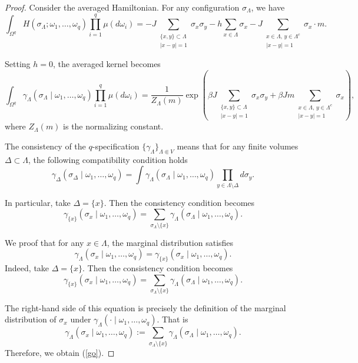 \documentclass[10pt,a4paper]{amsart}
\begin{document}
\begin{proof}
Consider the averaged Hamiltonian. For any configuration $\sigma_\Lambda$, we have
$$
\int_{\Omega^q} H(\sigma_\Lambda; \omega_1, \dots, \omega_q) \prod_{i=1}^q \mu(d\omega_i) = -J \sum_{\substack{\{x,y\} \subset \Lambda \\ |x-y|=1}} \sigma_x \sigma_y - h \sum_{x \in \Lambda} \sigma_x - J \sum_{\substack{x \in \Lambda,\, y \in \Lambda^c \\ |x-y|=1}} \sigma_x \cdot m.
$$

Setting $h = 0$, the averaged kernel becomes
$$
\int_{\Omega^q} \gamma_\Lambda(\sigma_\Lambda \mid \omega_1, \dots, \omega_q) \prod_{i=1}^q \mu(d\omega_i) = \frac{1}{Z_\Lambda(m)} \exp\left( \beta J \sum_{\substack{\{x,y\} \subset \Lambda \\ |x-y|=1}} \sigma_x \sigma_y + \beta J m \sum_{\substack{x \in \Lambda,\, y \in \Lambda^c \\ |x-y|=1}} \sigma_x \right),
$$
where $Z_\Lambda(m)$ is the normalizing constant.

The consistency of the $q$-specification $\{\gamma_\Lambda\}_{\Lambda \Subset V}$ means that for any finite volumes $\Delta \subset \Lambda$, the following compatibility condition holds
$$
\gamma_\Delta(\sigma_\Delta \mid \omega_1, \dots, \omega_q) = \int \gamma_\Lambda(\sigma_\Lambda \mid \omega_1, \dots, \omega_q) \prod_{y \in \Lambda \setminus \Delta} d\sigma_y.
$$

In particular, take $\Delta = \{x\}$. Then the consistency condition becomes
$$
\gamma_{\{x\}}(\sigma_x \mid \omega_1, \dots, \omega_q) = \sum_{\sigma_\Lambda \setminus \{x\}} \gamma_\Lambda(\sigma_\Lambda \mid \omega_1, \dots, \omega_q).
$$

We proof that for any $x \in \Lambda$, the marginal distribution satisfies
\begin{equation}\label{go}
\gamma_\Lambda(\sigma_x \mid \omega_1, \dots, \omega_q) = \gamma_{\{x\}}(\sigma_x \mid \omega_1, \dots, \omega_q).
\end{equation}
Indeed,  take $\Delta = \{x\}$. Then the consistency condition becomes
$$
\gamma_{\{x\}}(\sigma_x \mid \omega_1, \dots, \omega_q) = \sum_{\sigma_\Lambda \setminus \{x\}} \gamma_\Lambda(\sigma_\Lambda \mid \omega_1, \dots, \omega_q).
$$

The right-hand side of this equation is precisely the definition of the marginal distribution of $\sigma_x$ under $\gamma_\Lambda(\cdot \mid \omega_1, \dots, \omega_q)$. That is
$$
\gamma_\Lambda(\sigma_x \mid \omega_1, \dots, \omega_q) := \sum_{\sigma_\Lambda \setminus \{x\}} \gamma_\Lambda(\sigma_\Lambda \mid \omega_1, \dots, \omega_q).
$$ Therefore, we obtain (\ref{go}).


\end{proof}
\end{document}
